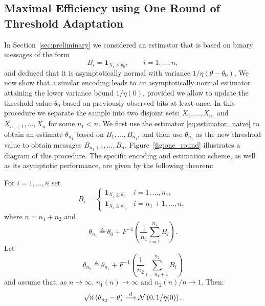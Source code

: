 
\subsection{Maximal Efficiency using One Round of Threshold Adaptation}
In Section~\ref{sec:preliminary} we considered an estimator that is based on binary messages of the form 
\begin{equation*}
B_i = \mathbf 1_{X_i > \theta_0},\qquad i=1,\ldots,n,
\end{equation*}
and deduced that it is asymptotically normal with variance $1/\eta(\theta-\theta_0)$.
%
We now show that a similar encoding leads to an asymptotically normal estimator attaining the lower variance bound $1/\eta(0)$, provided we allow to  update the threshold value $\theta_0$ based on previously observed bits at least once. 
%
In this procedure we separate the sample into two disjoint sets: $X_1,\ldots,X_{n_1}$ and $X_{n_1+1},\ldots,X_n$ for some $n_1 < n$.
We first use the estimator \eqref{eq:estimator_naive} to obtain an estimate ${\theta}_{n_1}$ based on $B_1,\ldots,B_{n_1}$, and then use ${\theta}_{n_1}$ as the new threshold value to obtain messages $B_{n_1+1}, \ldots, B_n$. Figure~\ref{fig:one_round} illustrates a diagram of this procedure. 
%
The specific encoding and estimation scheme, as well as its asymptotic performance, are given by the following theorem:
\begin{thm}
For $i=1,\ldots,n$ set
\begin{equation*}
B_i = \begin{cases}
 \mathbf 1_{X_i \geq \theta_0} & i = 1,\ldots,n_1, \\
 \mathbf 1_{X_i \geq {\theta}_{n_1} }& i={n_1+1,\ldots,n},
\end{cases}
\end{equation*}
where $n = n_1+ n_2$ and 
\begin{equation*}
{\theta}_{n_1} \triangleq \theta_0 + F^{-1}\left(
\frac{1}{n_1} \sum_{i=1}^{n_1} B_i 
 \right).
\end{equation*} 
Let 
\begin{equation*}
{\theta}_{n_2}  \triangleq {\theta}_{n_1} +  F^{-1} \left( \frac{1}{n_2} \sum_{i=n_1+1}^{n_2} B_i \right)
\end{equation*}
and assume that, as $n\to \infty$, $n_1(n) \rightarrow \infty$ and $n_2(n)/n \rightarrow 1$. Then:
\begin{align*}
 \sqrt{n} \left( {\theta}_{n_2} - \theta  \right) \overset{d}{\longrightarrow}  \mathcal{N}\left( 0, 1/\eta(0) \right).
\end{align*}
\end{thm}
